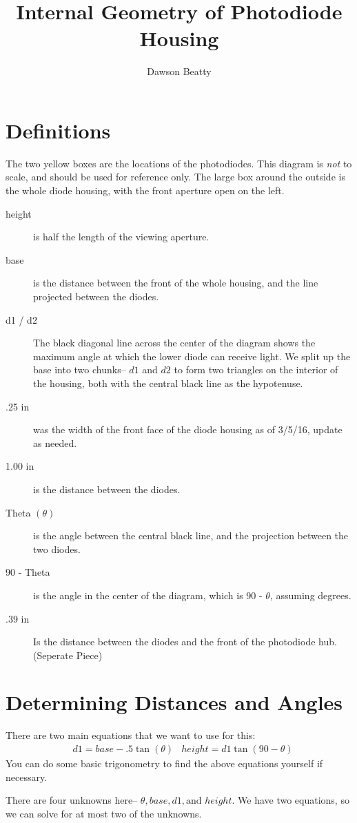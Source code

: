 \documentclass[10pt,letterpaper]{article}
\title{Internal Geometry of Photodiode Housing}
\author{Dawson Beatty}
\begin{document}
	\maketitle
	\section*{Definitions}
	The two yellow boxes are the locations of the photodiodes. This diagram is \textit{not} to scale, and should be used for reference only.  The large box around the outside is the whole diode housing, with the front aperture open on the left. 
	\begin{description}
		\item[height] is half the length of the viewing aperture.
		\item[base] is the distance between the front of the whole housing, and the line projected between the diodes.
		\item[d1 / d2] The black diagonal line across the center of the diagram shows the maximum angle at which the lower diode can receive light.  We split up the base into two chunks-- $d1$ and $d2$ to form two triangles on the interior of the housing, both with the central black line as the hypotenuse.
		\item[.25 in] was the width of the front face of the diode housing as of 3/5/16, update as needed.
		\item[1.00 in] is the distance between the diodes. 
		\item[Theta $(\theta)$] is the angle between the central black line, and the projection between the two diodes. 
		\item[90 - Theta] is the angle in the center of the diagram, which is 90 - $\theta$, assuming degrees. 
		\item[.39 in] Is the distance between the diodes and the front of the photodiode hub. (Seperate Piece)  
	\end{description}
	\section*{Determining Distances and Angles}
	There are two main equations that we want to use for this: 
	\begin{align*}
	& d1 = base - .5\tan(\theta) & height = d1 \tan(90 - \theta)
	\end{align*}
	You can do some basic trigonometry to find the above equations yourself if necessary. 
	
	There are four unknowns here-- $\theta, base, d1, \text{and } height$. We have two equations, so we can solve for at most two of the unknowns.  
	
\end{document}
